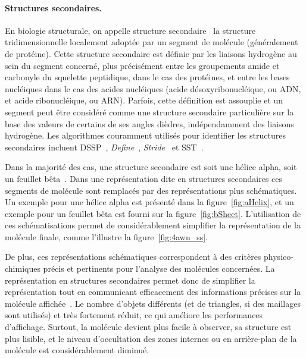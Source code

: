	\paragraph{Structures secondaires.} En biologie structurale, on appelle structure secondaire~\cite{foltmann1981protein} la structure tridimensionnelle localement adoptée par un segment de molécule (généralement de protéine). Cette structure secondaire est définie par les liaisons hydrogène au sein du segment concerné, plus précisément entre les groupements amide et carbonyle du squelette peptidique, dans le cas des protéines, et entre les bases nucléiques dans le cas des acides nucléiques (acide désoxyribonucléique, ou ADN, et acide ribonucléique, ou ARN). Parfois, cette définition est assouplie et un segment peut être considéré comme une structure secondaire particulière sur la base des valeurs de certains de ses angles dièdres, indépendamment des liaisons hydrogène. Les algorithmes couramment utilisés pour identifier les structures secondaires incluent DSSP~\cite{kabsch1983dictionary}, \emph{Define}~\cite{richards1988identification}, \emph{Stride}~\cite{frishman1995knowledge} et SST~\cite{konagurthu2012minimum}.
		
	Dans la majorité des cas, une structure secondaire est soit une hélice alpha, soit un feuillet bêta~\cite{pauling1951structure}. Dans une représentation dite \og en structures secondaires \fg{} ces segments de molécule sont remplacés par des représentations plus schématiques. Un exemple pour une hélice alpha est présenté dans la figure~\ref{fig:aHelix}, et un exemple pour un feuillet bêta est fourni sur la figure~\ref{fig:bSheet}. L'utilisation de ces schématisations permet de considérablement simplifier la représentation de la molécule finale, comme l'illustre la figure~\ref{fig:4awn_ss}.
		
	De plus, ces représentations schématiques correspondent à des critères physico-chimiques précis et pertinents pour l'analyse des molécules concernées. La représentation en structures secondaires permet donc de simplifier la représentation tout en communicant efficacement des informations précises sur la molécule affichée~\cite{richardson2002teaching}. Le nombre d'objets différents (et de triangles, si des maillages sont utilisés) et très fortement réduit, ce qui améliore les performances d'affichage. Surtout, la molécule devient plus facile à observer, sa structure est plus lisible, et le niveau d'occultation des zones internes ou en arrière-plan de la molécule est considérablement diminué.
		
